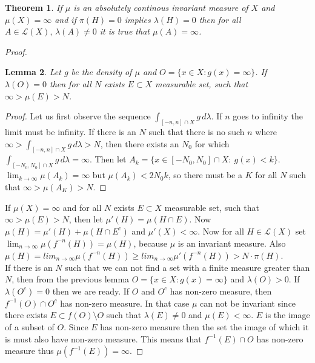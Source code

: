 \documentclass{article}
\newtheorem{theorem}{Theorem}[section]
\newtheorem{lemma}[theorem]{Lemma}
\begin{document}
\begin{theorem}
If $\mu$ is an absolutely continous invariant measure of $X$ and $\mu(X) = \infty$ and if $\pi(H)=0$ implies $\lambda(H)=0$ then for all $A \in \mathscr{L}(X),\, \lambda(A)\neq 0$ it is true that  $\mu(A)=\infty$.
\end{theorem}

\begin{proof}
\begin{lemma}
Let $g$ be the density of $\mu$ and $O = \{x\in X: g(x)=\infty\}$. If $\lambda(O) = 0$ then for all $N$ exists 
$E\subset X$ measurable set, such that $\infty > \mu(E) > N$.
\end{lemma}

\begin{proof}
Let us first observe the sequence $\int_{[-n,n]\cap X} g\, d\lambda$. If $n$ goes to infinity the limit must be infinity. If there is an $N$ such that there is no such $n$ where $\infty > \int_{[-n,n]\cap X} g\, d\lambda > N$, then there exists an $N_0$ for which $\int_{[-N_0,N_0]\cap X} g\, d\lambda = \infty$. Then let $A_k = \{x \in [-N_0,N_0]\cap X:\: g(x)<k\}$. $\lim_{k\rightarrow \infty} \mu(A_k) = \infty$ but $\mu(A_k) < 2N_0k$, so there must be a $K$ for all $N$ such that $\infty > \mu(A_K) > N$.
\end{proof}

If $\mu(X)=\infty$ and for all $N$ exists 
$E\subset X$ measurable set, such that $\infty > \mu(E) > N$, then let $\mu'(H) = \mu(H \cap E)$. Now $\mu(H) = \mu'(H) + \mu(H \cap E^c)$ and $\mu'(X) < \infty$. Now for all $H \in \mathscr{L}(X)$ set $\lim_{n\rightarrow \infty} \mu(f^{-n}(H)) = \mu(H)$, because $\mu$ is an invariant measure. Also $\mu(H) = lim_{n\rightarrow \infty} \mu(f^{-n}(H)) \geq lim_{n\rightarrow \infty} \mu'(f^{-n}(H)) > N\cdot \pi(H)$.\\

If there is an $N$ such that we can not find a set with a finite measure greater than $N$, then from the previous lemma $O = \{x\in X: g(x)=\infty\}$ and $\lambda(O) > 0$. If $\lambda(O^c) = 0$ then we are ready. If $O$ and $O^c$ has non-zero measure, then $f^{-1}(O) \cap O^c$ has non-zero measure. In that case $\mu$ can not be invariant since there exists $E \subset f(O) \setminus O$ such that $\lambda(E) \neq 0$ and $\mu(E) < \infty$. $E$ is the image of a subset of $O$. Since $E$ has non-zero measure then the set the image of which it is must also have non-zero measure. This means that $f^{-1}(E)\cap O$ has non-zero measure thus $\mu(f^{-1}(E))=\infty$.
\end{proof}
\end{document}
